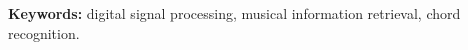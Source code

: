 \documentclass[12pt,twoside,a4paper]{book}
\begin{document}
\noindent \textbf{Keywords:} digital signal processing, musical information retrieval, chord recognition.


\tableofcontents






\mainmatter

\fancyhead[RE,LO]{\thesection}

\singlespacing              %
\end{document}
